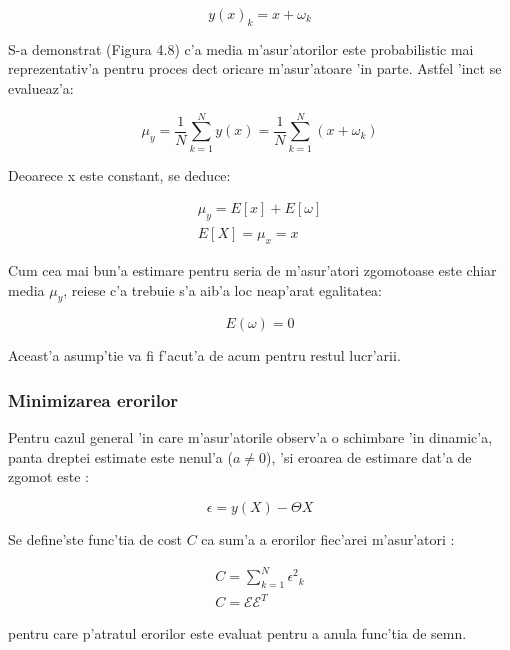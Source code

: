 \documentclass[12pt,a4paper,twoside]{report}
\begin{document}
\begin{equation}
    y(x)_k = x+ \omega_k 
\end{equation}


S-a demonstrat (Figura 4.8) c'a media m'asur'atorilor este probabilistic mai reprezentativ'a pentru proces dec\ia t oricare m'asur'atoare 'in parte. Astfel 'inc\ia t se evalueaz'a:

\begin{equation}
    \mu_y = \frac{1}{N} \sum_{k = 1}^{N} y(x) = \frac{1}{N} \sum_{k = 1}^{N} (x + \omega_k)
\end{equation}

Deoarece x este constant, se deduce:

\begin{gather}
    \mu_y = E[x] + E[\omega] \\ 
     E[X] = \mu_x = x
\end{gather}

Cum cea mai bun'a estimare pentru seria de m'asur'atori zgomotoase este chiar media $\mu_y$, reiese c'a trebuie s'a aib'a loc neap'arat egalitatea:

\begin{equation}
    E(\omega) = 0 
\end{equation}

Aceast'a asump'tie va fi f'acut'a de acum pentru restul lucr'arii.

\subsubsection{Minimizarea erorilor}

Pentru cazul general 'in care m'asur'atorile observ'a o schimbare 'in dinamic'a, panta dreptei estimate este nenul'a ($a \neq 0 $), 'si eroarea de estimare dat'a de zgomot este \cite{doi:https://doi.org/10.1002/0470013192.bsa199}: 

\begin{equation}
    \epsilon = y(X) - \Theta X
\end{equation}

Se define'ste func'tia de cost $C$ \cite{10.1115/1.3662552} ca sum'a a erorilor fiec'arei m'asur'atori \cite{LinReg}: 

\begin{gather}
    C = \sum_{k=1}^{N} {\epsilon^2}_k \\
    C = \mathcal{E} \mathcal{E}^T
\end{gather}

pentru care p'atratul erorilor este evaluat pentru a anula func'tia de semn.   
\end{document}
